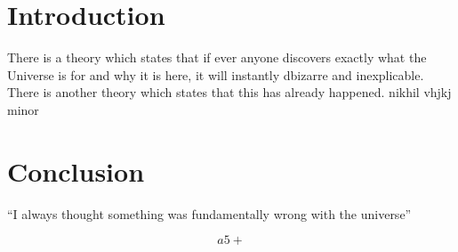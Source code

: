 \documentclass{article}
\title{}
\date{August 2019}
\begin{document}
\maketitle

\section{Introduction}
There is a theory which states that if ever anyone discovers exactly what the Universe is for and why it is here, it will instantly dbizarre and inexplicable.
There is another theory which states that this has already happened.
nikhil vhjkj minor

\section{Conclusion}
``I always thought something was fundamentally wrong with the universe'' \citep{adams1995hitchhiker}

\begin{equation}
    a5+
\end{equation}



\end{document}

